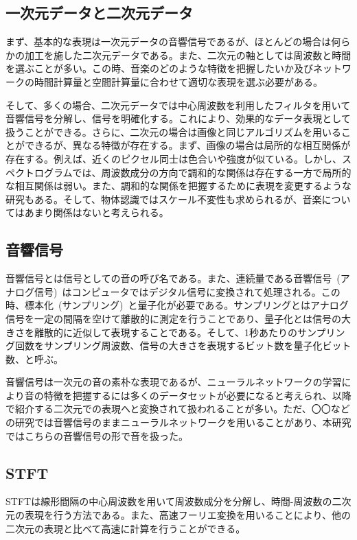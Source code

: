 \subsection{一次元データと二次元データ}

まず、基本的な表現は一次元データの音響信号であるが、ほとんどの場合は何らかの加工を施した二次元データである。また、二次元の軸としては周波数と時間を選ぶことが多い。この時、音楽のどのような特徴を把握したいか及びネットワークの時間計算量と空間計算量に合わせて適切な表現を選ぶ必要がある。

そして、多くの場合、二次元データでは中心周波数を利用したフィルタを用いて音響信号を分解し、信号を明確化する。これにより、効果的なデータ表現として扱うことができる。さらに、二次元の場合は画像と同じアルゴリズムを用いることができるが、異なる特徴が存在する。まず、画像の場合は局所的な相互関係が存在する。例えば、近くのピクセル同士は色合いや強度が似ている。しかし、スペクトログラムでは、周波数成分の方向で調和的な関係は存在する一方で局所的な相互関係は弱い。また、調和的な関係を把握するために表現を変更するような研究もある。そして、物体認識ではスケール不変性も求められるが、音楽についてはあまり関係はないと考えられる。

\subsection{音響信号}

音響信号とは信号としての音の呼び名である。また、連続量である音響信号~(アナログ信号)~はコンピュータではデジタル信号に変換されて処理される。この時、標本化~(サンプリング)~と量子化が必要である。サンプリングとはアナログ信号を一定の間隔を空けて離散的に測定を行うことであり、量子化とは信号の大きさを離散的に近似して表現することである。そして、1秒あたりのサンプリング回数をサンプリング周波数、信号の大きさを表現するビット数を量子化ビット数、と呼ぶ。

音響信号は一次元の音の素朴な表現であるが、ニューラルネットワークの学習により音の特徴を把握するには多くのデータセットが必要になると考えられ、以降で紹介する二次元での表現へと変換されて扱われることが多い。ただ、〇〇などの研究では音響信号のままニューラルネットワークを用いることがあり、本研究ではこちらの音響信号の形で音を扱った。

\subsection{STFT}

STFTは線形間隔の中心周波数を用いて周波数成分を分解し、時間-周波数の二次元の表現を行う方法である。また、高速フーリエ変換を用いることにより、他の二次元の表現と比べて高速に計算を行うことができる。

